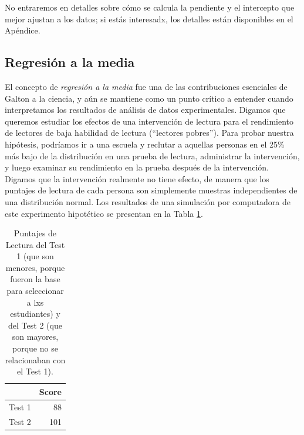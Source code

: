 \documentclass[
  12pt,
]{book}
\begin{document}
No entraremos en detalles sobre cómo se calcula la pendiente y el intercepto que mejor ajustan a los datos; si estás interesadx, los detalles están disponibles en el Apéndice.

\hypertarget{regression-to-the-mean}{%
\subsection{Regresión a la media}\label{regression-to-the-mean}}

El concepto de \emph{regresión a la media} fue una de las contribuciones esenciales de Galton a la ciencia, y aún se mantiene como un punto crítico a entender cuando interpretamos los resultados de análisis de datos experimentales. Digamos que queremos estudiar los efectos de una intervención de lectura para el rendimiento de lectores de baja habilidad de lectura (``lectores pobres''). Para probar nuestra hipótesis, podríamos ir a una escuela y reclutar a aquellas personas en el 25\% más bajo de la distribución en una prueba de lectura, administrar la intervención, y luego examinar su rendimiento en la prueba después de la intervención. Digamos que la intervención realmente no tiene efecto, de manera que los puntajes de lectura de cada persona son simplemente muestras independientes de una distribución normal. Los resultados de una simulación por computadora de este experimento hipotético se presentan en la Tabla \ref{tab:readingTable}.

\begin{table}

\caption{\label{tab:readingTable}Puntajes de Lectura del Test 1 (que son menores, porque fueron la base para seleccionar a lxs estudiantes) y del Test 2 (que son mayores, porque no se relacionaban con el Test 1).}
\centering
\begin{tabular}[t]{l|r}
\hline
  & Score\\
\hline
Test 1 & 88\\
\hline
Test 2 & 101\\
\hline
\end{tabular}
\end{table}
\end{document}
